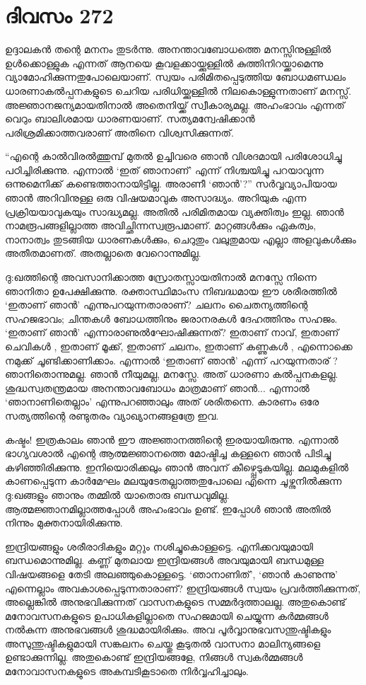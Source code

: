 \section{ദിവസം 272}


ഉദ്ദാലകന്‍ തന്റെ മനനം തുടര്‍ന്നു. അനന്താവബോധത്തെ മനസ്സിനുള്ളില്‍ ഉള്‍ക്കൊള്ളുക എന്നത് ആനയെ കൂവളക്കായ്ക്കുള്ളില്‍ കുത്തിനിറയ്ക്കാമെന്നു വ്യാമോഹിക്കുന്നതുപോലെയാണ്. സ്വയം പരിമിതപ്പെടുത്തിയ ബോധമണ്ഡലം ധാരണാകല്‍പ്പനകളുടെ ചെറിയ പരിധിയ്ക്കുള്ളില്‍ നിലകൊള്ളുന്നതാണ്‌ മനസ്സ്. അജ്ഞാനജന്യമായതിനാല്‍ അതെനിയ്ക്ക് സ്വീകാര്യമല്ല. അഹംഭാവം എന്നത് വെറും ബാലിശമായ ധാരണയാണ്. സത്യമന്വേഷിക്കാന്‍ പരിശ്രമിക്കാത്തവരാണ് അതിനെ വിശ്വസിക്കുന്നത്.  

“എന്റെ കാല്‍വിരല്‍ത്തുമ്പ്‌ മുതല്‍ ഉച്ചിവരെ ഞാന്‍ വിശദമായി പരിശോധിച്ചു പഠിച്ചിരിക്കുന്നു. എന്നാല്‍ ‘ഇത് ഞാനാണ്’ എന്ന് നിശ്ചയിച്ചു പറയാവുന്ന ഒന്നുമെനിക്ക് കണ്ടെത്താനായിട്ടില്ല. അരാണീ ‘ഞാന്‍’?” സര്‍വ്വവ്യാപിയായ ഞാന്‍ അറിവിനുള്ള ഒരു വിഷയമാവുക അസാദ്ധ്യം. അറിയുക എന്ന പ്രക്രിയയാവുകയും സാദ്ധ്യമല്ല. അതില്‍ പരിമിതമായ വ്യക്തിത്വം ഇല്ല. ഞാന്‍ നാമരൂപങ്ങളില്ലാത്ത അവിച്ഛിന്നസ്വരൂപമാണ്. മാറ്റങ്ങള്‍ക്കും ഏകത്വം, നാനാത്വം തുടങ്ങിയ ധാരണകള്‍ക്കും, ചെറുതും വലുതുമായ എല്ലാ  അളവുകള്‍ക്കും അതീതമാണത്. അതല്ലാതെ വേറൊന്നുമില്ല.

ദു:ഖത്തിന്റെ അവസാനിക്കാത്ത സ്രോതസ്സായതിനാല്‍ മനസ്സേ നിന്നെ ഞാനിതാ ഉപേക്ഷിക്കുന്നു. രക്താസ്ഥിമാംസ നിബദ്ധമായ ഈ ശരീരത്തില്‍ ‘ഇതാണ് ഞാന്‍’ എന്നുപറയുന്നതാരാണ്? ചലനം ചൈതന്യത്തിന്റെ സഹജഭാവം; ചിന്തകള്‍ ബോധത്തിനും ജരാനരകള്‍ ദേഹത്തിനും സഹജം. ‘ഇതാണ് ഞാന്‍’ എന്നാരാണുല്‍ഘോഷിക്കുന്നത്? ഇതാണ് നാവ്, ഇതാണ് ചെവികള്‍ , ഇതാണ് മൂക്ക്, ഇതാണ് ചലനം, ഇതാണ് കണ്ണുകള്‍ , എന്നൊക്കെ നമുക്ക് ചൂണ്ടിക്കാണിക്കാം. എന്നാല്‍ ‘ഇതാണ് ഞാന്‍’ എന്ന് പറയുന്നതാര് ? ഞാനിതൊന്നുമല്ല. ഞാന്‍ നീയുമല്ല, മനസ്സേ. അത് ധാരണാ കല്‍പ്പനകളല്ല. ശുദ്ധസ്വതന്ത്രമായ അനന്താവബോധം മാത്രമാണ് ഞാന്‍... എന്നാല്‍ ‘ഞാനാണിതെല്ലാം’ എന്നുപറഞ്ഞാലും അത് ശരിതന്നെ. കാരണം ഒരേ സത്യത്തിന്റെ രണ്ടുതരം വ്യാഖ്യാനങ്ങളത്രേ ഇവ.

കഷ്ടം! ഇത്രകാലം ഞാന്‍ ഈ അജ്ഞാനത്തിന്റെ ഇരയായിരുന്നു. എന്നാല്‍ ഭാഗ്യവശാല്‍ എന്റെ ആത്മജ്ഞാനത്തെ മോഷ്ടിച്ച കള്ളനെ ഞാന്‍ പിടിച്ചു കഴിഞ്ഞിരിക്കുന്നു. ഇനിയൊരിക്കലും ഞാന്‍ അവന്  കീഴ്പ്പെടുകയില്ല. മലമുകളില്‍ കാണപ്പെടുന്ന കാര്‍മേഘം മലയുടേതല്ലാത്തതുപോലെ എന്നെ ചൂഴ്ന്നുനില്‍ക്കുന്ന ദു:ഖങ്ങളും ഞാനും തമ്മില്‍ യാതൊരു ബന്ധവുമില്ല. ആത്മജ്ഞാനമില്ലാത്തപ്പോള്‍ അഹംഭാവം ഉണ്ട്. ഇപ്പോള്‍ ഞാന്‍ അതില്‍ നിന്നും മുക്തനായിരിക്കുന്നു.

ഇന്ദ്രിയങ്ങളും ശരീരാദികളും മറ്റും നശിച്ചുകൊള്ളട്ടെ. എനിക്കവയുമായി ബന്ധമൊന്നുമില്ല. കണ്ണ് മുതലായ ഇന്ദ്രിയങ്ങള്‍ അവയുമായി ബന്ധമുള്ള വിഷയങ്ങളെ തേടി അലഞ്ഞുകൊള്ളട്ടെ. ‘ഞാനാണിത്’, ‘ഞാന്‍ കാണുന്നു’ എന്നെല്ലാം അവകാശപ്പെടുന്നതാരാണ്? ഇന്ദ്രിയങ്ങള്‍ സ്വയം പ്രവര്‍ത്തിക്കുന്നത്, അല്ലെങ്കില്‍ അനുഭവിക്കുന്നത് വാസനകളുടെ സമ്മര്‍ദ്ദത്താലല്ല. അതുകൊണ്ട് മനോവസനകളുടെ ഉപാധികളില്ലാതെ സഹജമായി ചെയ്യുന്ന കര്‍മ്മങ്ങള്‍ നല്‍കുന്ന അനുഭവങ്ങള്‍ ശുദ്ധമായിരിക്കും. അവ പൂര്‍വ്വാനുഭവസന്തുഷ്ടികളും അസുന്തുഷ്ടികളുമായി സങ്കലനം ചെയ്തു കൂടുതല്‍ വാസനാ മാലിന്യങ്ങളെ ഉണ്ടാക്കുന്നില്ല. അതുകൊണ്ട് ഇന്ദ്രിയങ്ങളേ, നിങ്ങള്‍ സ്വകര്‍മ്മങ്ങള്‍ മനോവാസനകളുടെ അകമ്പടികൂടാതെ നിര്‍വ്വഹിച്ചാലും.

